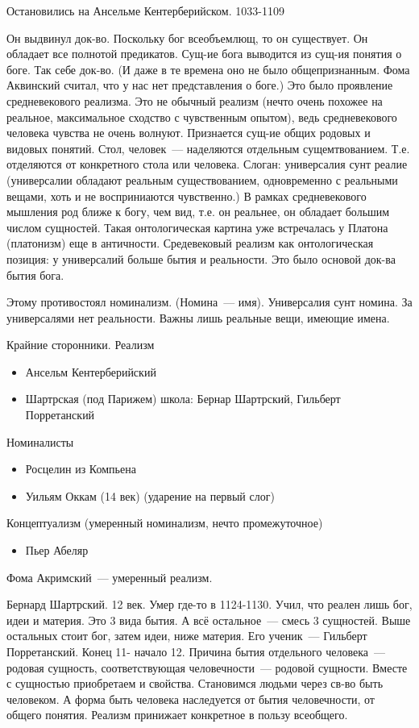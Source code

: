 Остановились на Ансельме Кентерберийском. 1033-1109

Он выдвинул док-во. Поскольку бог всеобъемлющ, то он существует. Он обладает все полнотой предикатов. Сущ-ие бога выводится из сущ-ия понятия о боге. Так себе док-во. (И даже в те времена оно не было общепризнанным. Фома Аквинский считал, что у нас нет представления о боге.)
Это было проявление средневекового реализма. Это не обычный реализм (нечто очень похожее на реальное, максимальное сходство с чувственным опытом), ведь средневекового человека чувства не очень волнуют. Признается сущ-ие общих родовых и видовых понятий. Стол, человек~--- наделяются отдельным сущемтвованием. Т.е. отделяются от конкретного стола или человека. Слоган: универсалия сунт реалие (универсалии обладают реальным существованием, одновременно с реальными вещами, хоть и не восприниаются чувственно.) В рамках средневекового мышления род ближе к богу, чем вид, т.е. он реальнее, он обладает большим числом сущностей. Такая онтологическая картина уже встречалась у Платона (платонизм) еще в античности. Средевековый реализм как онтологическая позиция: у универсалий больше бытия и реальности. Это было основой док-ва бытия бога.

Этому противостоял номинализм. (Номина~--- имя). Универсалия сунт номина. За универсалями нет реальности. Важны лишь реальные вещи, имеющие имена.

Крайние сторонники.
Реализм

\begin{itemize}
	\item Ансельм Кентерберийский
	\item Шартрская (под Парижем) школа: Бернар Шартрский, Гильберт Порретанский
\end{itemize}

Номиналисты
\begin{itemize}
	\item Росцелин из Компьена
	\item Уильям Оккам (14 век) (ударение на первый слог)
\end{itemize}

Концептуализм (умеренный номинализм, нечто промежуточное)
\begin{itemize}
	\item Пьер Абеляр
\end{itemize}
Фома Акримский~--- умеренный реализм.

Бернард Шартрский. 12 век. Умер где-то в 1124-1130. Учил, что реален лишь бог, идеи и материя. Это 3 вида бытия. А всё остальное~--- смесь 3 сущностей. Выше остальных стоит бог, затем идеи, ниже материя.
Его ученик~--- Гильберт Порретанский. Конец 11- начало 12. Причина бытия отдельного человека~--- родовая сущность, соответствующая человечности~--- родовой сущности. Вместе с сущностью приобретаем и свойства. Становимся людьми через св-во быть человеком. А форма быть человека наследуется от бытия человечности, от общего понятия. Реализм принижает конкретное в пользу всеобщего.

